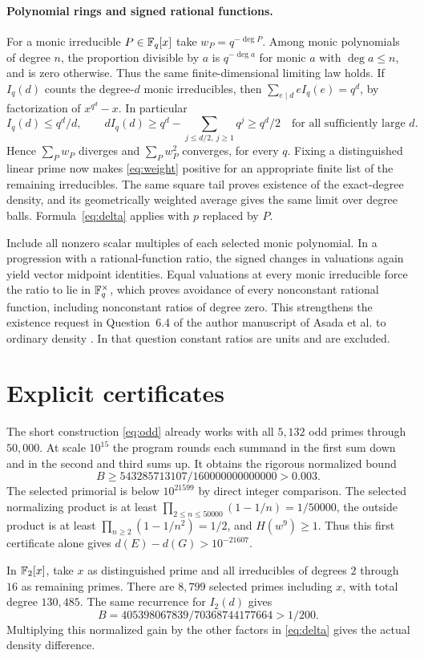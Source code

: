 \paragraph{Polynomial rings and signed rational functions.}
For a monic irreducible $P\in\mathbb F_q[x]$ take $w_P=q^{-\deg P}$. Among monic polynomials of degree $n$, the proportion divisible by $a$ is $q^{-\deg a}$ for monic $a$ with $\deg a\le n$, and is zero otherwise. Thus the same finite-dimensional limiting law holds. If $I_q(d)$ counts the degree-$d$ monic irreducibles, then $\sum_{e\mid d}eI_q(e)=q^d$, by factorization of $x^{q^d}-x$. In particular
\[
 I_q(d)\le q^d/d,\qquad
 dI_q(d)\ge q^d-\sum_{j\le d/2,\ j\ge1}q^j\ge q^d/2
 \quad\text{for all sufficiently large }d.
\]
Hence $\sum_P w_P$ diverges and $\sum_P w_P^2$ converges, for every $q$. Fixing a distinguished linear prime now makes \eqref{eq:weight} positive for an appropriate finite list of the remaining irreducibles. The same square tail proves existence of the exact-degree density, and its geometrically weighted average gives the same limit over degree balls. Formula~\eqref{eq:delta} applies with $p$ replaced by $P$.

Include all nonzero scalar multiples of each selected monic polynomial. In a progression with a rational-function ratio, the signed changes in valuations again yield vector midpoint identities. Equal valuations at every monic irreducible force the ratio to lie in $\mathbb F_q^\times$, which proves avoidance of every nonconstant rational function, including nonconstant ratios of degree zero. This strengthens the existence request in Question~6.4 of the author manuscript of Asada et al. to ordinary density \cite{asada}. In that question constant ratios are units and are excluded.

\section{Explicit certificates}
The short construction \eqref{eq:odd} already works with all $5{,}132$ odd primes through $50{,}000$. At scale $10^{15}$ the program rounds each summand in the first sum down and in the second and third sums up. It obtains the rigorous normalized bound
\[
 B\ge 543285713107/160000000000000>0.003 .
\]
The selected primorial is below $10^{21599}$ by direct integer comparison. The selected normalizing product is at least $\prod_{2\le n\le 50000}(1-1/n)=1/50000$, the outside product is at least $\prod_{n\ge2}(1-1/n^2)=1/2$, and $H(w^9)\ge1$. Thus this first certificate alone gives $d(E)-d(G)>10^{-21607}$.

In $\mathbb F_2[x]$, take $x$ as distinguished prime and all irreducibles of degrees $2$ through $16$ as remaining primes. There are $8{,}799$ selected primes including $x$, with total degree $130{,}485$. The same recurrence for $I_2(d)$ gives
\[
 B=405398067839/70368744177664>1/200 .
\]
Multiplying this normalized gain by the other factors in \eqref{eq:delta} gives the actual density difference.


